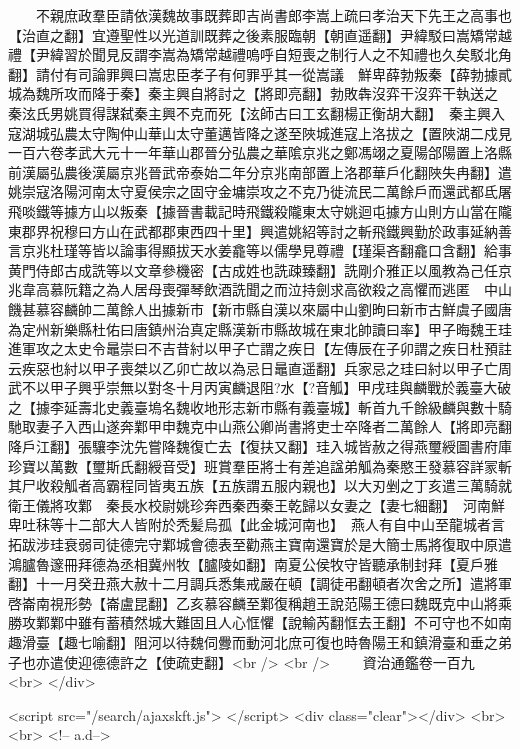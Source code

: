 　　不親庶政羣臣請依漢魏故事既葬即吉尚書郎李嵩上疏曰孝治天下先王之高事也【治直之翻】宜遵聖性以光道訓既葬之後素服臨朝【朝直遥翻】尹緯駁曰嵩矯常越禮【尹緯習於聞見反謂李嵩為矯常越禮嗚呼自短喪之制行人之不知禮也久矣駁北角翻】請付有司論罪興曰嵩忠臣孝子有何罪乎其一從嵩議　鮮卑薛勃叛秦【薛勃據貳城為魏所攻而降于秦】秦主興自將討之【將即亮翻】勃敗犇沒弈干沒弈干執送之　秦泫氏男姚買得謀弑秦主興不克而死【泫師古曰工玄翻楊正衡胡大翻】　秦主興入寇湖城弘農太守陶仲山華山太守董邁皆降之遂至陜城進寇上洛拔之【置陜湖二戍見一百六卷孝武大元十一年華山郡晉分弘農之華隂京兆之鄭馮翊之夏陽郃陽置上洛縣前漢屬弘農後漢屬京兆晉武帝泰始二年分京兆南部置上洛郡華戶化翻陜失冉翻】遣姚崇寇洛陽河南太守夏侯宗之固守金墉崇攻之不克乃徙流民二萬餘戶而還武都氐屠飛啖鐵等據方山以叛秦【據晉書載記時飛鐵殺隴東太守姚迴屯據方山則方山當在隴東郡界祝穆曰方山在武都郡東西四十里】興遣姚紹等討之斬飛鐵興勤於政事延納善言京兆杜瑾等皆以論事得顯拔天水姜龕等以儒學見尊禮【瑾渠吝翻龕口含翻】給事黄門侍郎古成詵等以文章參機密【古成姓也詵疎臻翻】詵剛介雅正以風教為己任京兆韋高慕阮籍之為人居母喪彈琴飲酒詵聞之而泣持劍求高欲殺之高懼而逃匿　中山饑甚慕容麟帥二萬餘人出據新市【新市縣自漢以來屬中山劉昫曰新市古鮮虞子國唐為定州新樂縣杜佑曰唐鎮州治真定縣漢新市縣故城在東北帥讀曰率】甲子晦魏王珪進軍攻之太史令鼂崇曰不吉昔紂以甲子亡謂之疾日【左傳辰在子卯謂之疾日杜預註云疾惡也紂以甲子喪桀以乙卯亡故以為忌日鼂直遥翻】兵家忌之珪曰紂以甲子亡周武不以甲子興乎崇無以對冬十月丙寅麟退阻?水【?音觚】甲戌珪與麟戰於義臺大破之【據李延壽北史義臺塢名魏收地形志新市縣有義臺城】斬首九千餘級麟與數十騎馳取妻子入西山遂奔鄴甲申魏克中山燕公卿尚書將吏士卒降者二萬餘人【將即亮翻降戶江翻】張驤李沈先嘗降魏復亡去【復扶又翻】珪入城皆赦之得燕璽綬圖書府庫珍寶以萬數【璽斯氏翻綬音受】班賞羣臣將士有差追諡弟觚為秦愍王發慕容詳冡斬其尸收殺觚者高霸程同皆夷五族【五族謂五服内親也】以大刃剉之丁亥遣三萬騎就衛王儀將攻鄴　秦長水校尉姚珍奔西秦西秦王乾歸以女妻之【妻七細翻】　河南鮮卑吐秣等十二部大人皆附於秃髪烏孤【此金城河南也】　燕人有自中山至龍城者言拓跋涉珪衰弱司徒德完守鄴城會德表至勸燕主寶南還寶於是大簡士馬將復取中原遣鴻臚魯邃冊拜德為丞相冀州牧【臚陵如翻】南夏公侯牧守皆聽承制封拜【夏戶雅翻】十一月癸丑燕大赦十二月調兵悉集戒嚴在頓【調徒弔翻頓者次舍之所】遣將軍啓崙南視形勢【崙盧昆翻】乙亥慕容麟至鄴復稱趙王說范陽王德曰魏既克中山將乘勝攻鄴鄴中雖有蓄積然城大難固且人心恇懼【說輸芮翻恇去王翻】不可守也不如南趣滑臺【趣七喻翻】阻河以待魏伺釁而動河北庶可復也時魯陽王和鎮滑臺和垂之弟子也亦遣使迎德德許之【使疏吏翻】<br />
<br />
　　資治通鑑卷一百九  <br>
   </div> 

<script src="/search/ajaxskft.js"> </script>
 <div class="clear"></div>
<br>
<br>
 <!-- a.d-->

